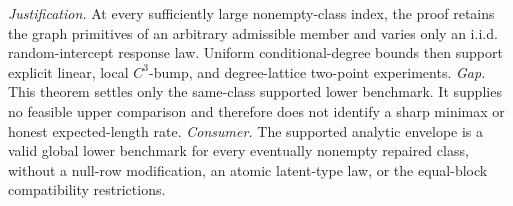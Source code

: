 \documentclass{article}
\begin{document}
\par\smallskip\noindent \textit{Justification.} At every sufficiently large nonempty-class index, the proof retains the graph primitives of an arbitrary admissible member and varies only an i.i.d. random-intercept response law.  Uniform conditional-degree bounds then support explicit linear, local \(C^3\)-bump, and degree-lattice two-point experiments. \textit{Gap.} This theorem settles only the same-class supported lower benchmark.  It supplies no feasible upper comparison and therefore does not identify a sharp minimax or honest expected-length rate. \textit{Consumer.} The supported analytic envelope is a valid global lower benchmark for every eventually nonempty repaired class, without a null-row modification, an atomic latent-type law, or the equal-block compatibility restrictions.
\end{document}
